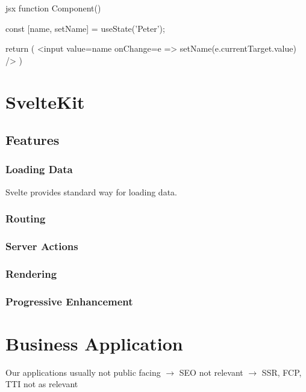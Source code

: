 \begin{myminted}{jsx}{}
function Component() {
    const [name, setName] = useState('Peter');

    return ( 
        <input 
            value={name}
            onChange={e => setName(e.currentTarget.value)} 
        />
    )
}
\end{myminted}

\section{SvelteKit}
\label{sec:sveltekit}


\subsection{Features}

\subsubsection{Loading Data}
\label{sec:sveltekit-loading}

Svelte provides standard way for loading data.

\subsubsection{Routing}

\subsubsection{Server Actions}
\label{sec:sveltekit-server-actions}
 
\subsubsection{Rendering}

\subsubsection{Progressive Enhancement}

\section{Business Application}
\label{sec:business-application}

Our applications usually not public facing $\rightarrow$ SEO not relevant $\rightarrow$ SSR, FCP, TTI not as relevant
